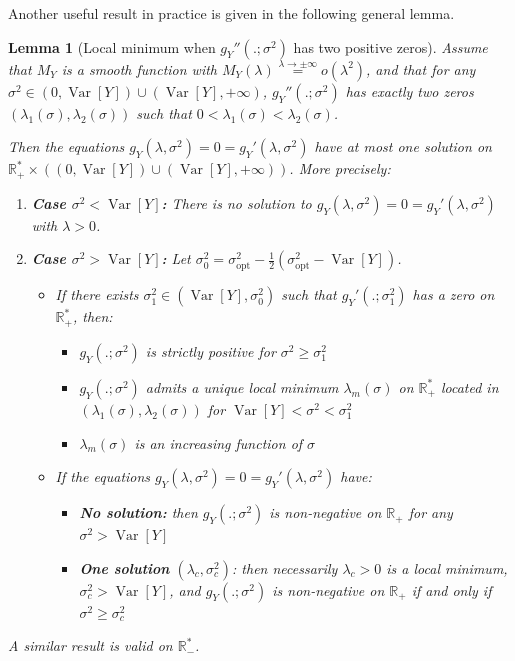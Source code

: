 \documentclass[a4paper, 10pt]{article}
\newtheorem{lemma}{Lemma}[section]
\theoremstyle{definition}
\begin{document}
Another useful result in practice is given in the following general lemma.
\begin{lemma}[Local minimum when $g_Y''(.;\sigma^2)$ has two positive zeros]
\label{LemmaMerged}
Assume that $M_Y$ is a smooth function with $M_Y(\lambda)\overset{\lambda\to \pm\infty}{=}o(\lambda^2)$, and that for any $\sigma^2\in (0,\operatorname{Var}[Y])\cup(\operatorname{Var}[Y],+\infty)$, $g_Y''(.;\sigma^2)$ has exactly two zeros $(\lambda_1(\sigma),\lambda_2(\sigma))$ such that $0<\lambda_1(\sigma)<\lambda_2(\sigma)$. 

Then the equations $g_Y(\lambda,\sigma^2)=0=g_Y'(\lambda,\sigma^2)$ have at most one solution on $\mathbb{R}_+^*\times((0,\operatorname{Var}[Y])\cup(\operatorname{Var}[Y],+\infty))$. More precisely:

\begin{enumerate}
\item \textbf{Case $\sigma^2 < \operatorname{Var}[Y]$:} There is no solution to $g_Y(\lambda,\sigma^2)=0=g_Y'(\lambda,\sigma^2)$ with $\lambda>0$.

\item \textbf{Case $\sigma^2 > \operatorname{Var}[Y]$:} Let $\sigma_0^2=\sigma_{\mathrm{opt}}^2 -\frac{1}{2}(\sigma_{\mathrm{opt}}^2-\operatorname{Var}[Y])$. 
\begin{itemize}
    \item If there exists $\sigma_1^2\in(\operatorname{Var}[Y],\sigma_0^2)$ such that $g_Y'(.;\sigma_1^2)$ has a zero on $\mathbb{R}_+^*$, then:
    \begin{itemize}
        \item $g_Y(.;\sigma^2)$ is strictly positive for $\sigma^2\geq\sigma_1^2$
        \item $g_Y(.;\sigma^2)$ admits a unique local minimum $\lambda_m(\sigma)$ on $\mathbb{R}_+^*$ located in $(\lambda_1(\sigma),\lambda_2(\sigma))$ for $\operatorname{Var}[Y]<\sigma^2<\sigma_1^2$
        \item $\lambda_m(\sigma)$ is an increasing function of $\sigma$
    \end{itemize}
    
    \item If the equations $g_Y(\lambda,\sigma^2)=0=g_Y'(\lambda,\sigma^2)$ have:
    \begin{itemize}
        \item \textbf{No solution:} then $g_Y(.;\sigma^2)$ is non-negative on $\mathbb{R}_+$ for any $\sigma^2>\operatorname{Var}[Y]$
        \item \textbf{One solution} $(\lambda_c,\sigma_c^2)$: then necessarily $\lambda_c>0$ is a local minimum, $\sigma_c^2>\operatorname{Var}[Y]$, and $g_Y(.;\sigma^2)$ is non-negative on $\mathbb{R}_+$ if and only if $\sigma^2\geq \sigma_c^2$
    \end{itemize}
\end{itemize}
\end{enumerate}

A similar result is valid on $\mathbb{R}_-^*$.
\end{lemma}
\end{document}
